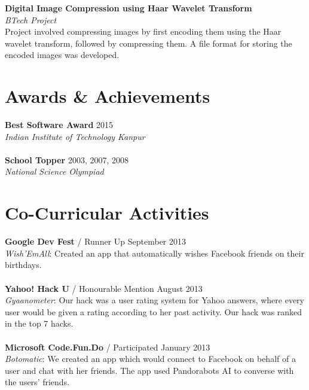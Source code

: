 \documentclass[margin,line]{res}
\begin{document}
\begin{resume}
{\bf Digital Image Compression using Haar Wavelet Transform} \\
{\em BTech Project} \\
Project involved compressing images by first encoding them using the Haar wavelet transform, followed by compressing them. A file format for storing the encoded images was developed. 

\section{\sc Awards \& Achievements}

{\bf Best Software Award} {\hfill} 2015 \\
{\em Indian Institute of Technology Kanpur} \\
\\
{\bf School Topper} {\hfill} 2003, 2007, 2008 \\
{\em National Science Olympiad} \\

\section{\sc Co-Curricular Activities}

{\bf Google Dev Fest} / Runner Up {\hfill} September 2013 \\
{\em Wish’EmAll}: Created an app that automatically wishes Facebook friends on their birthdays. \\
\\
{\bf Yahoo! Hack U} / Honourable Mention {\hfill} August 2013 \\
{\em Gyaanometer}: Our hack was a user rating system for Yahoo answers, where every user would be given a rating according to her past activity. Our hack was ranked in the top 7 hacks. \\
\\
{\bf Microsoft Code.Fun.Do} / Participated {\hfill} January 2013 \\
{\em Botomatic}: We created an app which would connect to Facebook on behalf of a user and chat with her friends. The app used Pandorabots AI to converse with the users' friends.

\end{resume}
\end{document}
